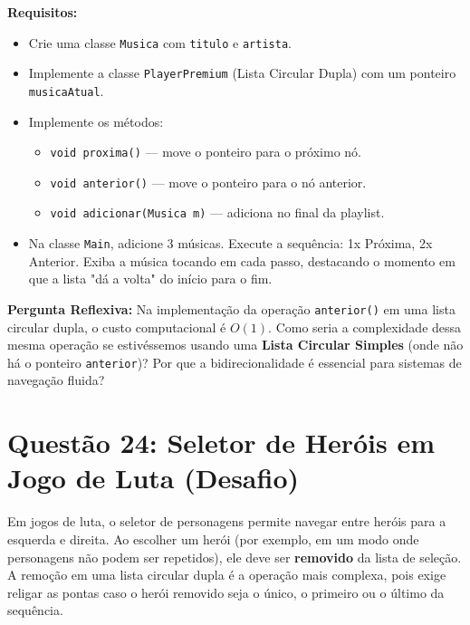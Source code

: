 \documentclass[12pt, a4paper]{article}
\begin{document}
\textbf{Requisitos:}
\begin{itemize}
    \item Crie uma classe \texttt{Musica} com \texttt{titulo} e \texttt{artista}.
    \item Implemente a classe \texttt{PlayerPremium} (Lista Circular Dupla) com um ponteiro \texttt{musicaAtual}.
    \item Implemente os métodos:
    \begin{itemize}
        \item \texttt{void proxima()} — move o ponteiro para o próximo nó.
        \item \texttt{void anterior()} — move o ponteiro para o nó anterior.
        \item \texttt{void adicionar(Musica m)} — adiciona no final da playlist.
    \end{itemize}
    \item Na classe \texttt{Main}, adicione 3 músicas. Execute a sequência: 1x Próxima, 2x Anterior. Exiba a música tocando em cada passo, destacando o momento em que a lista "dá a volta" do início para o fim.
\end{itemize}

\textbf{Pergunta Reflexiva:} Na implementação da operação \texttt{anterior()} em uma lista circular dupla, o custo computacional é $O(1)$. Como seria a complexidade dessa mesma operação se estivéssemos usando uma \textbf{Lista Circular Simples} (onde não há o ponteiro \texttt{anterior})? Por que a bidirecionalidade é essencial para sistemas de navegação fluida?

\vspace{0.2cm}

\section*{Questão 24: Seletor de Heróis em Jogo de Luta (Desafio)}
Em jogos de luta, o seletor de personagens permite navegar entre heróis para a esquerda e direita. Ao escolher um herói (por exemplo, em um modo onde personagens não podem ser repetidos), ele deve ser \textbf{removido} da lista de seleção. A remoção em uma lista circular dupla é a operação mais complexa, pois exige religar as pontas caso o herói removido seja o único, o primeiro ou o último da sequência.
\end{document}
